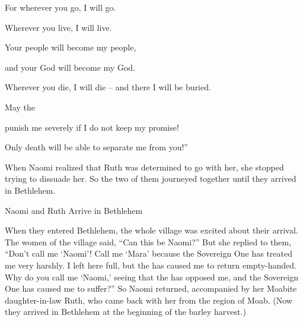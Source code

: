 {\par }{\Q For
wherever
you go,
I will go.
\par }{\Q Wherever
you live,
I will live.
\par }{\Q Your people
will become my people,
\par }{\Q and your God
will become my God.
\par }{\Q {}Wherever
you die,
I will die
– and there
I will be buried.
\par }{\Q May
the

{}
punish me severely
if
I do
not keep my promise!

\par }{\Q Only death
will be able to separate me from you!”
\par }{\PP {}When Naomi realized
that
Ruth was determined
to go
with
her, she stopped
trying to dissuade
her.
So
the two
of them journeyed
together until
they arrived
in Bethlehem.
\par }{\SH Naomi and Ruth Arrive in Bethlehem
\par }{\PP When
they entered
Bethlehem,
the whole
village
was excited about their
arrival. The women of the village
said, “Can this
be Naomi?”
But she replied
to
them, “Don’t
call
me ‘Naomi’! Call
me ‘Mara’
because
the Sovereign One
has treated me very
harshly.
I
left
here full,
but the
{}
has caused me to return
empty-handed.
Why
do you call
me ‘Naomi,’
seeing that the
{}
has opposed me,
and the Sovereign One
has caused me to suffer?”
So Naomi
returned,
accompanied by her Moabite
daughter-in-law
Ruth,
who came back
with
her from the region
of Moab.
(Now they
arrived
in Bethlehem
at the beginning
of the barley
harvest.)

}
